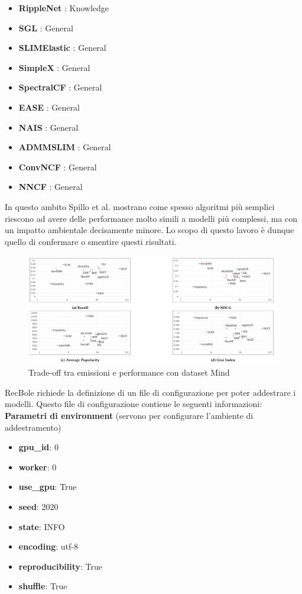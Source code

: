 \begin{itemize}
    \item \textbf{RippleNet} \cite{RippleNet}: Knowledge
    \item \textbf{SGL} \cite{SGL}: General
    \item \textbf{SLIMElastic} \cite{SLIMElastic}: General
    \item \textbf{SimpleX} \cite{SimpleX}: General
    \item \textbf{SpectralCF} \cite{SpectralCF}: General
    \item \textbf{EASE} \cite{EASE}: General
    \item \textbf{NAIS} \cite{NAIS}: General
    \item \textbf{ADMMSLIM} \cite{ADMMSLIM}: General
    \item \textbf{ConvNCF} \cite{ConvNCF}: General
    \item \textbf{NNCF} \cite{NNCF}: General
\end{itemize}

\noindent In questo ambito  Spillo et al.\cite{spillo2023towards} mostrano come spesso algoritmi più semplici riescono ad avere delle performance molto simili a modelli più complessi, ma con un impatto ambientale decisamente minore. Lo scopo di questo lavoro è dunque quello di confermare o smentire questi risultati.\\
\begin{figure}[H]
    \centering
    \includegraphics[width=\textwidth]{images/risultati-valutazione.png}
    \caption{Trade-off tra emissioni e performance con dataset Mind}
\end{figure}

\noindent RecBole richiede la definizione di un file di configurazione per poter addestrare i modelli. Questo file di configurazione contiene le seguenti informazioni:\\
\noindent \textbf{Parametri di environment} (servono per configurare l'ambiente di addestramento)
\begin{itemize}
    \item \textbf{gpu\_id}: 0
    \item \textbf{worker}: 0
    \item \textbf{use\_gpu}: True
    \item \textbf{seed}: 2020
    \item \textbf{state}: INFO
    \item \textbf{encoding}: utf-8
    \item \textbf{reproducibility}: True
    \item \textbf{shuffle}: True
\end{itemize}


